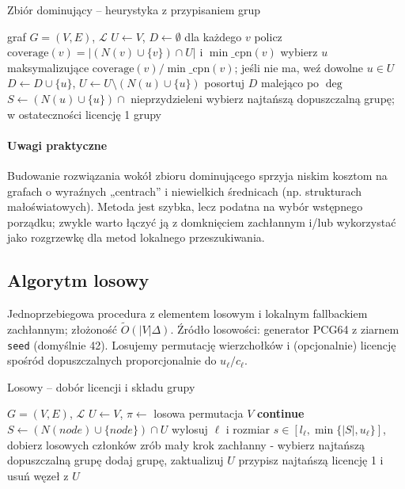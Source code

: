\begin{algorithm}[H]
\caption{Zbiór dominujący -- heurystyka z przypisaniem grup}
\label{alg:ds}
\begin{algorithmic}[1]
\Require graf $G=(V,E)$, $\mathcal{L}$
\State $U\gets V$, $D\gets\emptyset$
  \State dla każdego $v$ policz $\mathrm{coverage}(v)=|(N(v)\cup\{v\})\cap U|$ i $\min\_\mathrm{cpn}(v)$
  \State wybierz $u$ maksymalizujące $\mathrm{coverage}(v)/\min\_\mathrm{cpn}(v)$; jeśli nie ma, weź dowolne $u\in U$
  \State $D\gets D\cup\{u\}$, $U\gets U\setminus(N(u)\cup\{u\})$
\EndWhile
\State posortuj $D$ malejąco po $\deg$
  \State $S\gets(N(u)\cup\{u\})\cap$ nieprzydzieleni
  \State wybierz najtańszą dopuszczalną grupę; w ostateczności licencję 1
\EndFor
\State \Return grupy
\end{algorithmic}
\end{algorithm}

\paragraph{Uwagi praktyczne}
Budowanie rozwiązania wokół zbioru dominującego sprzyja niskim kosztom na grafach o wyraźnych „centrach” i niewielkich średnicach (np. strukturach małoświatowych). Metoda jest szybka, lecz podatna na wybór wstępnego porządku; zwykle warto łączyć ją z domknięciem zachłannym i/lub wykorzystać jako rozgrzewkę dla metod lokalnego przeszukiwania.

\subsection{Algorytm losowy}\label{subsec:random}

Jednoprzebiegowa procedura z elementem losowym i lokalnym fallbackiem zachłannym; złożoność $\tilde O(|V|\Delta)$. Źródło losowości: generator PCG64 z ziarnem \texttt{seed} (domyślnie 42). Losujemy permutację wierzchołków i (opcjonalnie) licencję spośród dopuszczalnych proporcjonalnie do $u_\ell/c_\ell$.

\begin{algorithm}[H]
\caption{Losowy -- dobór licencji i składu grupy}
\label{alg:randomized}
\begin{algorithmic}[1]
\Require $G=(V,E)$, $\mathcal{L}$
\State $U\gets V$, $\pi\gets$ losowa permutacja $V$
   \textbf{continue}\EndIf
  \State $S\gets(N(node)\cup\{node\})\cap U$
    \State wylosuj $\ell$ i rozmiar $s\in[l_\ell,\min\{|S|,u_\ell\}]$, dobierz losowych członków
  \Else
    \State zrób mały krok zachłanny - wybierz najtańszą dopuszczalną grupę
  \EndIf
  \State dodaj grupę, zaktualizuj $U$
\EndFor
{} przypisz najtańszą licencję 1 i usuń węzeł z $U$ \EndWhile
\end{algorithmic}
\end{algorithm}

